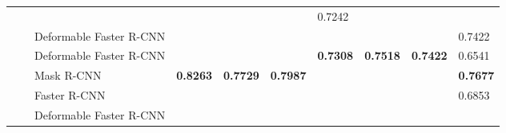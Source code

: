 \documentclass{ieeeaccess}
\begin{document}
\begin{table*}
\begin{tabularx}{\linewidth}{|u|u|t|v|v|k|v|v|k|k|}
        \footnotesize {}&
        \footnotesize {}&
        \footnotesize {}&
        \footnotesize {}&
        \footnotesize {}&
        \footnotesize {}&
        \footnotesize 
        {0.7242} \\
        & &\footnotesize  Deformable Faster R-CNN &
        
        \footnotesize {}&
        \footnotesize {}&
        \footnotesize {}&
        \footnotesize {}&
        \footnotesize {}&
        \footnotesize {}&
        \footnotesize {0.7422} \\
         & &\footnotesize  Deformable Faster R-CNN&
        \footnotesize {}&
        \footnotesize {}&
        \footnotesize {}&
        \footnotesize \centering \textbf{0.7308}&
        \footnotesize \centering \textbf{0.7518}&
        \footnotesize \centering \textbf{0.7422}&
        \footnotesize {0.6541} \\
        & &\footnotesize  Mask R-CNN&
        \footnotesize \centering \textbf{0.8263}&
        \footnotesize \centering \textbf{0.7729}&
        \footnotesize \centering \textbf{0.7987}&
        \footnotesize {}&
        \footnotesize {}&
        \footnotesize {}&
        \footnotesize \textbf{0.7677} \\
        & \footnotesize {}&
        \footnotesize  Faster R-CNN&
        \footnotesize {}&
        \footnotesize {}&
        \footnotesize {}&
        \footnotesize {}&
        \footnotesize {}&
        \footnotesize {}&
        \footnotesize 
        {0.6853} \\
        & &\footnotesize  Deformable Faster R-CNN &
        

\end{tabularx}
\end{table*}
\end{document}
